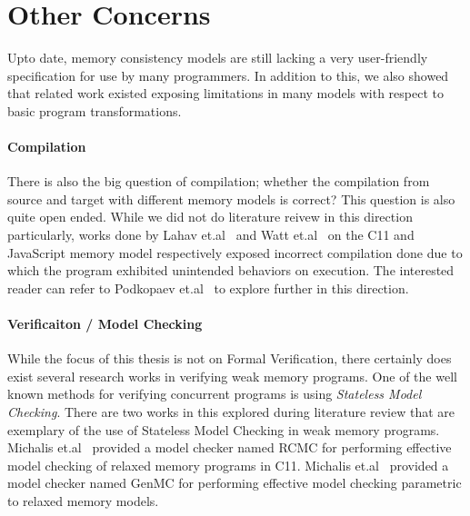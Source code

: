 \section{Other Concerns}

    Upto date, memory consistency models are still lacking a very user-friendly specification for use by many programmers. 
    In addition to this, we also showed that related work existed exposing limitations in many models with respect to basic program transformations.
    
    \paragraph{Compilation}
    There is also the big question of compilation; whether the compilation from source and target with different memory models is correct? This question is also quite open ended. While we did not do literature reivew in this direction particularly, works done by Lahav et.al~\cite{Lahav} and Watt et.al~\cite{WattC} on the C11 and JavaScript memory model respectively exposed incorrect compilation done due to which the program exhibited unintended behaviors on execution. 
    The interested reader can refer to Podkopaev et.al~\cite{Anton} to explore further in this direction.
    
    \paragraph{Verificaiton / Model Checking}
    While the focus of this thesis is not on Formal Verification, there certainly does exist several research works in verifying weak memory programs. 
    One of the well known methods for verifying concurrent programs is using \textit{Stateless Model Checking}. 
    There are two works in this explored during literature review that are exemplary of the use of Stateless Model Checking in weak memory programs.
    Michalis et.al~\cite{Michalis1} provided a model checker named RCMC for performing effective model checking of relaxed memory programs in C11. 
    Michalis et.al~\cite{Michalis2} provided a model checker named GenMC for performing effective model checking parametric to relaxed memory models. 
    
